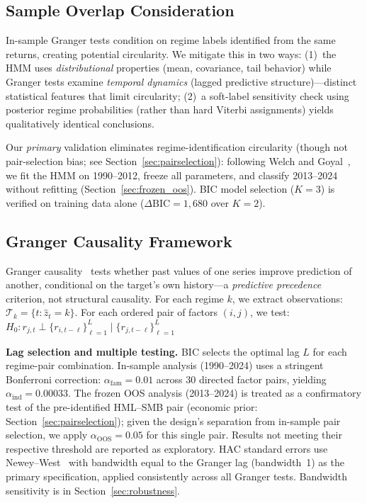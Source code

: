 \documentclass[sigconf,anonymous]{acmart}
\begin{document}
\subsection{Sample Overlap Consideration}

In-sample Granger tests condition on regime labels identified from the same returns,
creating potential circularity. We mitigate this in two ways: (1)~the HMM uses
\emph{distributional} properties (mean, covariance, tail behavior) while Granger
tests examine \emph{temporal dynamics} (lagged predictive structure)---distinct
statistical features that limit circularity; (2)~a soft-label sensitivity check
using posterior regime probabilities (rather than hard Viterbi assignments) yields
qualitatively identical conclusions.

Our \emph{primary} validation eliminates regime-identification circularity
(though not pair-selection bias; see Section~\ref{sec:pairselection}): following
Welch and Goyal~\cite{welch2008comprehensive}, we fit the HMM on 1990--2012,
freeze all parameters, and classify 2013--2024 without refitting
(Section~\ref{sec:frozen_oos}). BIC model selection ($K=3$) is verified on
training data alone ($\Delta\text{BIC} = 1{,}680$ over $K=2$).

\subsection{Granger Causality Framework}
\label{sec:granger_method}

Granger causality~\cite{granger1969investigating,shojaie2022granger} tests whether past values
of one series improve prediction of another, conditional on the target's own history---a
\emph{predictive precedence} criterion, not structural causality.
For each regime $k$, we extract observations: $\mathcal{T}_k = \{t : \hat{z}_t = k\}$.
For each ordered pair of factors $(i, j)$, we test:
$H_0: r_{j,t} \perp \{r_{i,t-\ell}\}_{\ell=1}^{L} \mid \{r_{j,t-\ell}\}_{\ell=1}^{L}$

\textbf{Lag selection and multiple testing.}
BIC selects the optimal lag $L$ for each regime-pair combination. In-sample analysis
(1990--2024) uses a stringent Bonferroni correction: $\alpha_{\text{fam}} = 0.01$
across 30 directed factor pairs, yielding $\alpha_{\text{ind}} = 0.00033$.
The frozen OOS analysis (2013--2024) is treated as a confirmatory test of the
pre-identified HML--SMB pair (economic prior: Section~\ref{sec:pairselection});
given the design's separation from in-sample pair selection, we apply $\alpha_{\text{OOS}} = 0.05$
for this single pair. Results not meeting their respective threshold are reported as exploratory.
HAC standard errors use Newey--West~\cite{newey1987simple} with bandwidth equal to the
Granger lag (bandwidth~1) as the primary specification, applied consistently across all
Granger tests. Bandwidth sensitivity is in Section~\ref{sec:robustness}.
\end{document}

